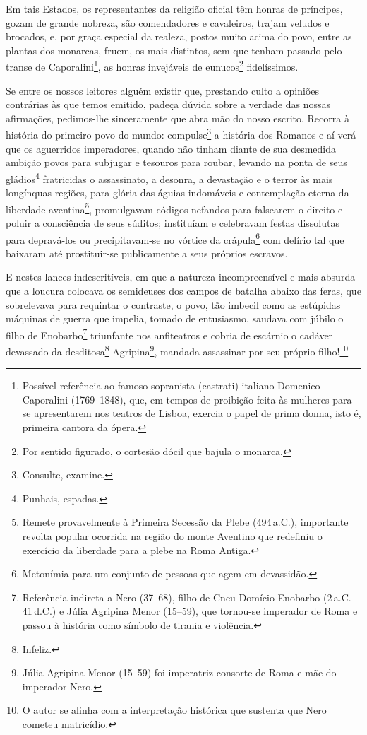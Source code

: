 Em tais Estados, os representantes da religião oficial têm honras de
príncipes, gozam de grande nobreza, são comendadores e cavaleiros,
trajam veludos e brocados, e, por graça especial da realeza, postos
muito acima do povo, entre as plantas dos monarcas, fruem, os mais
distintos, sem que tenham passado pelo transe de Caporalini\footnote{
  Possível referência ao famoso sopranista (castrati) italiano Domenico
  Caporalini (1769--1848), que, em tempos de proibição feita às mulheres
  para se apresentarem nos teatros de Lisboa, exercia o papel de prima
  donna, isto é, primeira cantora da ópera.}, as honras invejáveis de
eunucos\footnote{Por sentido figurado, o cortesão dócil que bajula o
  monarca.} fidelíssimos.

Se entre os nossos leitores alguém existir que, prestando culto a
opiniões contrárias às que temos emitido, padeça dúvida sobre a verdade
das nossas afirmações, pedimos-lhe sinceramente que abra mão do nosso
escrito. Recorra à história do primeiro povo do mundo:
compulse\footnote{Consulte, examine.} a história dos Romanos e aí verá
que os aguerridos imperadores, quando não tinham diante de sua desmedida
ambição povos para subjugar e tesouros para roubar, levando na ponta de
seus gládios\footnote{Punhais, espadas.} fratricidas o assassinato, a
desonra, a devastação e o terror às mais longínquas regiões, para glória
das águias indomáveis e contemplação eterna da liberdade
aventina\footnote{Remete provavelmente à Primeira Secessão da Plebe
  (494\,a.C.), importante revolta popular ocorrida na região do monte
  Aventino que redefiniu o exercício da liberdade para a plebe na Roma
  Antiga.}, promulgavam códigos nefandos para falsearem o direito e
poluir a consciência de seus súditos; instituíam e celebravam festas
dissolutas para depravá-los ou precipitavam-se no vórtice da
crápula\footnote{Metonímia para um conjunto de pessoas que agem em
  devassidão.} com delírio tal que baixaram até prostituir-se
publicamente a seus próprios escravos.

E nestes lances indescritíveis, em que a natureza incompreensível e mais
absurda que a loucura colocava os semideuses dos campos de batalha
abaixo das feras, que sobrelevava para requintar o contraste, o povo,
tão imbecil como as estúpidas máquinas de guerra que impelia, tomado de
entusiasmo, saudava com júbilo o filho de Enobarbo\footnote{Referência
  indireta a Nero (37--68), filho de Cneu Domício Enobarbo (2\,a.C.--41\,d.C.) e
  Júlia Agripina Menor (15--59), que tornou-se imperador de Roma e passou
  à história como símbolo de tirania e violência.} triunfante nos
anfiteatros e cobria de escárnio o cadáver devassado da
desditosa\footnote{Infeliz.} Agripina\footnote{Júlia Agripina Menor
  (15--59) foi imperatriz-consorte de Roma e mãe do imperador Nero.},
mandada assassinar por seu próprio filho!\footnote{O autor se alinha
  com a interpretação histórica que sustenta que Nero cometeu
  matricídio.}

